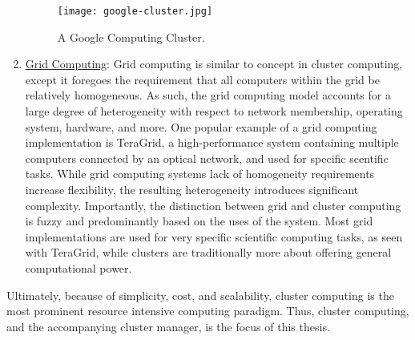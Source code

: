 \begin{enumerate}
    \begin{figure}[!h]
      \centerline{\texttt{[image: google-cluster.jpg]}}
      \caption{A Google Computing Cluster.\cite{image-google-cluster}}
    \end{figure}

  \item \underline{Grid Computing}: Grid computing is similar to concept in
    cluster computing, except it foregoes the requirement that all computers
    within the grid be relatively homogeneous. As such, the grid computing model accounts
    for a large degree of heterogeneity with respect to network membership,
    operating system, hardware, and more.\cite[pg.
    18]{distributed-systems-principles-and-paradigms} One popular example of a
    grid computing implementation is TeraGrid, a high-performance system
    containing multiple computers connected by an optical network, and used for
    specific scentific tasks.\cite{building-the-teragrid} While grid computing
    systems lack of homogeneity requirements increase flexibility,
    the resulting heterogeneity introduces significant complexity. Importantly,
    the distinction between grid and cluster computing is fuzzy and
    predominantly based on the uses of the system. Most grid implementations are
    used for very specific scientific computing tasks, as seen with TeraGrid,
    while clusters are traditionally more about offering general computational
    power.

\end{enumerate}

Ultimately, because of simplicity, cost, and scalability, cluster computing is
the most prominent resource intensive computing paradigm. Thus, cluster
computing, and the accompanying cluster manager, is the focus of this
thesis.

